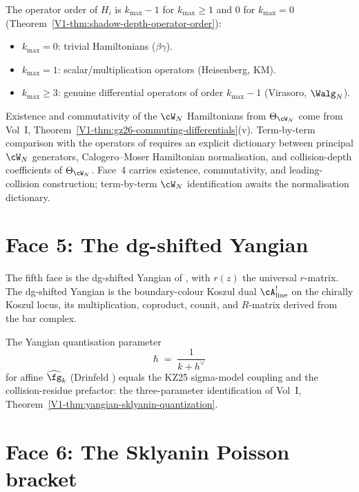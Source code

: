 The operator order of $H_i$ is $k_{\max}-1$ for $k_{\max}\geq 1$
and $0$ for $k_{\max}=0$
(Theorem~\ref{V1-thm:shadow-depth-operator-order}):
\begin{itemize}
\item $k_{\max}=0$: trivial Hamiltonians ($\beta\gamma$).
\item $k_{\max}=1$: scalar/multiplication operators (Heisenberg, KM).
\item $k_{\max}\geq 3$: genuine differential operators of order $k_{\max}-1$ (Virasoro, $\Walg_N$).
\end{itemize}

\begin{remark}
\label{rem:vol2-gz26-wn-normalization}
Existence and commutativity of the $\cW_N$ Hamiltonians from
$\Theta_{\cW_N}$ come from Vol~I,
Theorem~\ref{V1-thm:gz26-commuting-differentials}(v). Term-by-term
comparison with the operators of \cite{GZ26} requires an explicit
dictionary between principal $\cW_N$ generators, Calogero--Moser
Hamiltonian normalisation, and collision-depth coefficients of
$\Theta_{\cW_N}$. Face~4 carries existence, commutativity, and
leading-collision construction; term-by-term $\cW_N$ identification
awaits the normalisation dictionary.
\end{remark}

\section{Face 5: The dg-shifted Yangian}
\label{sec:face-5-dg-shifted-yangian}

The fifth face is the dg-shifted Yangian of \cite{DNP25}, with
$r(z)$ the universal $r$-matrix. The dg-shifted Yangian is the
boundary-colour Koszul dual $\cA^!_{\mathrm{line}}$ on the
chirally Koszul locus, its multiplication, coproduct, counit, and
$R$-matrix derived from the bar complex.

The Yangian quantisation parameter
\[
\hbar
\;=\;
\frac{1}{k+h^\vee}
\]
for affine $\widehat{\fg}_k$ (Drinfeld \cite{Drinfeld85}) equals
the KZ25 sigma-model coupling and the collision-residue prefactor:
the three-parameter identification of Vol~I,
Theorem~\ref{V1-thm:yangian-sklyanin-quantization}.

\section{Face 6: The Sklyanin Poisson bracket}
\label{sec:face-6-sklyanin}

